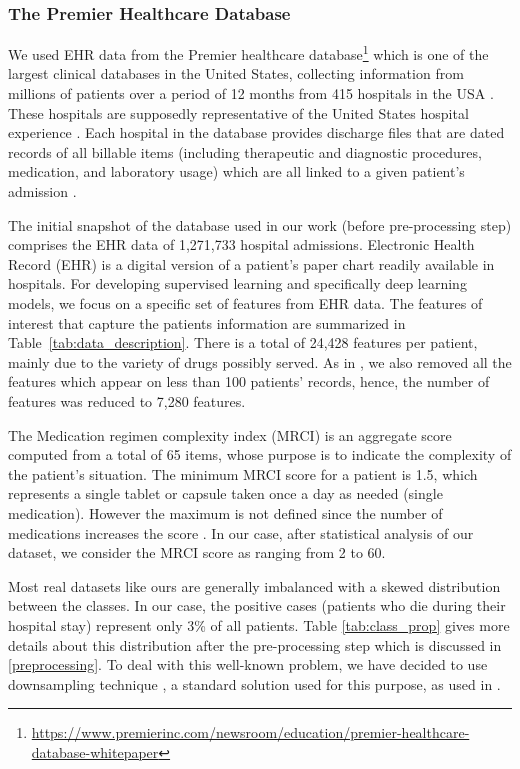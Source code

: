 \documentclass[accepted]{uai2021} %
\begin{document}
\subsubsection{The Premier Healthcare Database}

We used EHR data from the Premier healthcare database\footnote{\href{https://www.premierinc.com/newsroom/education/premier-healthcare-database-whitepaper}{https://www.premierinc.com/newsroom/education/premier-healthcare-database-whitepaper}} which is one of the largest clinical databases in the United States, collecting information from millions of patients over a period of 12 months from 415 hospitals in the USA \citep{Papier_Amela}. These hospitals are supposedly representative of the United States hospital experience \citep{Papier_Amela}. Each hospital in the database provides discharge files that are dated records of all billable items (including therapeutic and diagnostic procedures, medication, and laboratory usage) which are all linked to a given patient's admission \citep{Papier_Amela,Makadia}. 

The initial snapshot of the database used in our work (before pre-processing step) comprises the EHR data of 1,271,733 hospital admissions.
Electronic Health Record (EHR) is a digital version of a patient’s paper chart readily available in hospitals. For developing supervised learning and specifically deep learning models, we focus on a specific set of features from EHR data. The features of interest that capture the patients information are summarized in Table~\ref{tab:data_description}. There is a total of 24,428 features per patient, mainly due to the variety of drugs possibly served. As in \cite{Avati2018}, we also removed all the features which appear on less than 100 patients' records, hence, the number of features was reduced to 7,280 features. 

The Medication regimen complexity index (MRCI) \citep{MRCI} is an aggregate score computed from a total of 65 items, whose purpose is to indicate the complexity of the patient's situation. The minimum MRCI score for a patient is 1.5, which represents a single tablet or capsule taken once a day as needed (single medication). However the maximum is not defined since the number of medications increases the score \citep{MRCI}. In our case, after statistical analysis of our dataset, we consider the MRCI score as ranging from 2 to 60.




Most real datasets like ours are generally imbalanced with a skewed distribution between the classes. In our case, the positive cases (patients who die during their hospital stay) represent only 3\% of all patients. Table \ref{tab:class_prop} gives more details about this distribution after the pre-processing step which is discussed in \ref{preprocessing}. To deal with this well-known problem, we have decided to use downsampling technique \citep{more2016survey,he2009learning}, a standard solution used for this purpose, as used in \cite{our_cs}.
\end{document}
